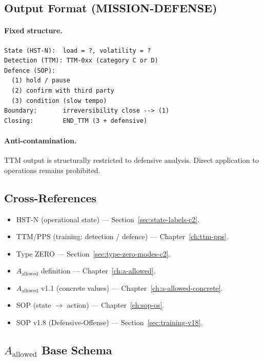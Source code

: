 \subsection{Output Format (MISSION-DEFENSE)}
\label{sec:mission-defense-output}

\paragraph{Fixed structure.}

\begin{lstlisting}[basicstyle=\ttfamily\small,frame=single]
State (HST-N):  load = ?, volatility = ?
Detection (TTM): TTM-0xx (category C or D)
Defence (SOP):
  (1) hold / pause
  (2) confirm with third party
  (3) condition (slow tempo)
Boundary:       irreversibility close --> (1)
Closing:        END_TTM (3 + defensive)
\end{lstlisting}

\paragraph{Anti-contamination.}
TTM output is structurally restricted to defensive analysis. Direct
application to operations remains prohibited.

\subsection{Cross-References}
\label{sec:mission-defense-xref}

\begin{itemize}
\item HST-N (operational state) ---
Section~\ref{sec:state-labels-c2}.
\item TTM/PPS (training: detection / defence) ---
Chapter~\ref{ch:ttm-pps}.
\item Type ZERO ---
Section~\ref{sec:type-zero-modes-c2}.
\item $A_{\mathrm{allowed}}$ definition ---
Chapter~\ref{ch:a-allowed}.
\item $A_{\mathrm{allowed}}$ v1.1 (concrete values) ---
Chapter~\ref{ch:a-allowed-concrete}.
\item SOP (state $\to$ action) ---
Chapter~\ref{ch:sop-os}.
\item SOP v1.8 (Defensive-Offense) ---
Section~\ref{sec:training-v18}.
\end{itemize}

\subsection{$A_{\mathrm{allowed}}$ Base Schema}
\label{sec:a-allowed-base-schema-c2}

